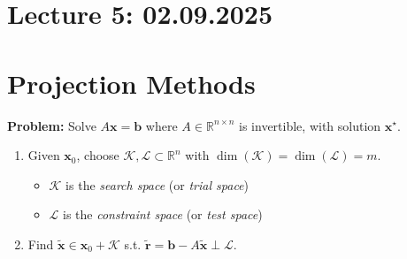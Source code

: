 \section{Lecture 5: 02.09.2025}

\section*{Projection Methods}
\textbf{Problem:} Solve $A\mathbf{x} = \mathbf{b}$ where $A  \in  \mathbb{R}^{n \times n}$ is invertible, with solution $\mathbf{x}^\star$.
\begin{enumerate}
    \item Given $\mathbf{x}_0$, choose $\mathcal{K}, \mathcal{L} \subset \mathbb{R}^n$ with $\dim(\mathcal{K}) = \dim(\mathcal{L}) = m$.
          \begin{itemize}
              \item $\mathcal{K}$ is the \emph{search space} (or \emph{trial space})
              \item $\mathcal{L}$ is the \emph{constraint space} (or \emph{test space})
          \end{itemize}
    \item Find $\widetilde{\mathbf{x}}  \in  \mathbf{x}_0 + \mathcal{K}$ s.t. $\widetilde{\mathbf{r}} = \mathbf{b} - A\widetilde{\mathbf{x}} \perp \mathcal{L}$.
\end{enumerate}

